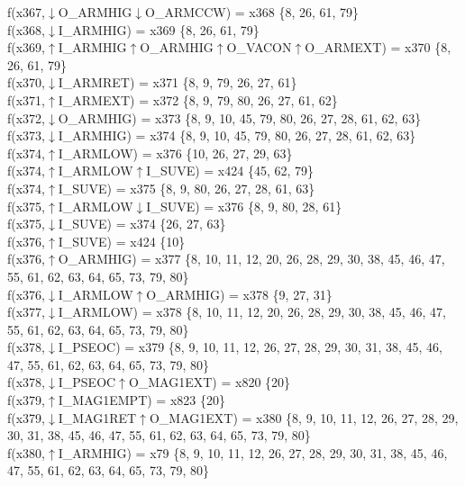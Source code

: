 f(x367,$\downarrow$O\_ARMHIG$\downarrow$O\_ARMCCW) = x368 \{8, 26, 61, 79\} \\  
f(x368,$\downarrow$I\_ARMHIG) = x369 \{8, 26, 61, 79\} \\  
f(x369,$\uparrow$I\_ARMHIG$\uparrow$O\_ARMHIG$\uparrow$O\_VACON$\uparrow$O\_ARMEXT) = x370 \{8, 26, 61, 79\} \\  
f(x370,$\downarrow$I\_ARMRET) = x371 \{8, 9, 79, 26, 27, 61\} \\  
f(x371,$\uparrow$I\_ARMEXT) = x372 \{8, 9, 79, 80, 26, 27, 61, 62\} \\  
f(x372,$\downarrow$O\_ARMHIG) = x373 \{8, 9, 10, 45, 79, 80, 26, 27, 28, 61, 62, 63\} \\  
f(x373,$\downarrow$I\_ARMHIG) = x374 \{8, 9, 10, 45, 79, 80, 26, 27, 28, 61, 62, 63\} \\  
f(x374,$\uparrow$I\_ARMLOW) = x376 \{10, 26, 27, 29, 63\} \\  
f(x374,$\uparrow$I\_ARMLOW$\uparrow$I\_SUVE) = x424 \{45, 62, 79\} \\  
f(x374,$\uparrow$I\_SUVE) = x375 \{8, 9, 80, 26, 27, 28, 61, 63\} \\  
f(x375,$\uparrow$I\_ARMLOW$\downarrow$I\_SUVE) = x376 \{8, 9, 80, 28, 61\} \\  
f(x375,$\downarrow$I\_SUVE) = x374 \{26, 27, 63\} \\  
f(x376,$\uparrow$I\_SUVE) = x424 \{10\} \\  
f(x376,$\uparrow$O\_ARMHIG) = x377 \{8, 10, 11, 12, 20, 26, 28, 29, 30, 38, 45, 46, 47, 55, 61, 62, 63, 64, 65, 73, 79, 80\} \\  
f(x376,$\downarrow$I\_ARMLOW$\uparrow$O\_ARMHIG) = x378 \{9, 27, 31\} \\  
f(x377,$\downarrow$I\_ARMLOW) = x378 \{8, 10, 11, 12, 20, 26, 28, 29, 30, 38, 45, 46, 47, 55, 61, 62, 63, 64, 65, 73, 79, 80\} \\  
f(x378,$\downarrow$I\_PSEOC) = x379 \{8, 9, 10, 11, 12, 26, 27, 28, 29, 30, 31, 38, 45, 46, 47, 55, 61, 62, 63, 64, 65, 73, 79, 80\} \\  
f(x378,$\downarrow$I\_PSEOC$\uparrow$O\_MAG1EXT) = x820 \{20\} \\  
f(x379,$\uparrow$I\_MAG1EMPT) = x823 \{20\} \\  
f(x379,$\downarrow$I\_MAG1RET$\uparrow$O\_MAG1EXT) = x380 \{8, 9, 10, 11, 12, 26, 27, 28, 29, 30, 31, 38, 45, 46, 47, 55, 61, 62, 63, 64, 65, 73, 79, 80\} \\  
f(x380,$\uparrow$I\_ARMHIG) = x79 \{8, 9, 10, 11, 12, 26, 27, 28, 29, 30, 31, 38, 45, 46, 47, 55, 61, 62, 63, 64, 65, 73, 79, 80\} \\  

